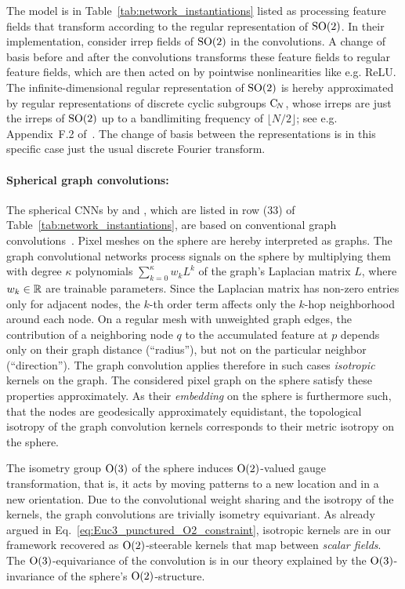 The model is in Table~\ref{tab:network_instantiations} listed as processing feature fields that transform according to the regular representation of $\operatorname{SO}(2)$.
In their implementation, \citet{kicanaoglu2019gaugeSphere} consider irrep fields of $\operatorname{SO}(2)$ in the convolutions.
A change of basis before and after the convolutions transforms these feature fields to regular feature fields, which are then acted on by pointwise nonlinearities like e.g. ReLU.
The infinite-dimensional regular representation of $\operatorname{SO}(2)$ is hereby approximated by regular representations of discrete cyclic subgroups $\operatorname{C}_{\!N}$, whose irreps are just the irreps of $\operatorname{SO}(2)$ up to a bandlimiting frequency of $\lfloor N/2 \rfloor$; see e.g. Appendix~F.2 of~\cite{Weiler2019_E2CNN}.
The change of basis between the representations is in this specific case just the usual discrete Fourier transform.




\paragraph{Spherical graph convolutions:}

The spherical CNNs by \citet{perraudin2018DeepSphere} and \citet{yang2020rotation}, which are listed in row (33) of Table~\ref{tab:network_instantiations}, are based on conventional graph convolutions~\cite{kipf2016semi}.
Pixel meshes on the sphere are hereby interpreted as graphs.
The graph convolutional networks process signals on the sphere by multiplying them with degree $\kappa$ polynomials $\sum_{k=0}^\kappa w_k L^k$ of the graph's Laplacian matrix $L$, where $w_k \in \mathbb{R}$ are trainable parameters.
Since the Laplacian matrix has non-zero entries only for adjacent nodes, the $k$-th order term affects only the $k$-hop neighborhood around each node.
On a regular mesh with unweighted graph edges, the contribution of a neighboring node $q$ to the accumulated feature at $p$ depends only on their graph distance (``radius''), but not on the particular neighbor (``direction'').
The graph convolution applies therefore in such cases \emph{isotropic} kernels on the graph.
The considered pixel graph on the sphere satisfy these properties approximately.
As their \emph{embedding} on the sphere is furthermore such, that the nodes are geodesically approximately equidistant, the topological isotropy of the graph convolution kernels corresponds to their metric isotropy on the sphere.


The isometry group $\operatorname{O}(3)$ of the sphere induces $\operatorname{O}(2)$-valued gauge transformation, that is, it acts by moving patterns to a new location and in a new orientation.
Due to the convolutional weight sharing and the isotropy of the kernels, the graph convolutions are trivially isometry equivariant.
As already argued in Eq.~\eqref{eq:Euc3_punctured_O2_constraint}, isotropic kernels are in our framework recovered as $\operatorname{O}(2)$-steerable kernels that map between \emph{scalar fields}.
The $\operatorname{O}(3)$-equivariance of the convolution is in our theory explained by the $\operatorname{O}(3)$-invariance of the sphere's $\operatorname{O}(2)$-structure.





